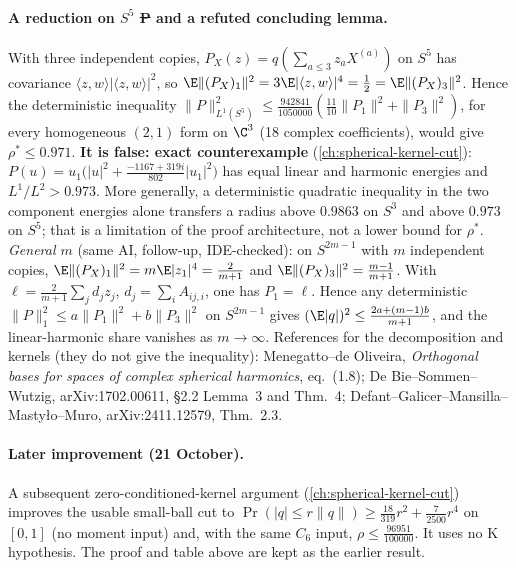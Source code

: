 \paragraph{A reduction on $S^5$ \st{P} and a refuted concluding lemma.} With three independent copies, $P_X(z)=q(\sum_{a\le3}z_aX^{(a)})$ on $S^5$ has covariance
$\langle z,w\rangle|\langle z,w\rangle|^2$, so $\E\|(P_X)_1\|^2=3\E|\langle z,w\rangle|^4=\frac12=\E\|(P_X)_3\|^2$. Hence the deterministic inequality
$\|P\|_{L^1(S^5)}^2\le\frac{942841}{1050000}(\frac{11}{10}\|P_1\|^2+\|P_3\|^2)$, for every homogeneous $(2,1)$ form on $\C^3$ (18 complex coefficients), would give
$\rho^*\le0.971$. \textbf{It is false: exact counterexample} (\autoref{ch:spherical-kernel-cut}): $P(u)=u_1\bigl(|u|^2+\frac{-1167+319i}{802}|u_1|^2\bigr)$ has
equal linear and harmonic energies and $L^1/L^2>0.973$. More generally, a deterministic quadratic inequality in the two component energies alone transfers
a radius above $0.9863$ on $S^3$ and above $0.973$ on $S^5$; that is a limitation of the proof architecture, not a lower bound for $\rho^*$. \emph{General $m$} (same AI, follow-up, IDE-checked):
on $S^{2m-1}$ with $m$ independent copies, $\E\|(P_X)_1\|^2=m\E|z_1|^4=\frac2{m+1}$ and $\E\|(P_X)_3\|^2=\frac{m-1}{m+1}$. With
$\ell=\frac2{m+1}\sum_jd_jz_j$, $d_j=\sum_iA_{ij,i}$, one has $P_1=\ell$. Hence any deterministic $\|P\|_1^2\le a\|P_1\|^2+b\|P_3\|^2$ on $S^{2m-1}$ gives
$(\E|q|)^2\le\frac{2a+(m-1)b}{m+1}$, and the linear-harmonic share vanishes as $m\to\infty$. References for the decomposition and kernels (they do not give the
inequality): Menegatto--de Oliveira, \emph{Orthogonal bases for spaces of complex spherical harmonics}, eq.~(1.8); De Bie--Sommen--Wutzig, arXiv:1702.00611,
§2.2 Lemma~3 and Thm.~4; Defant--Galicer--Mansilla--Masty{\l}o--Muro, arXiv:2411.12579, Thm.~2.3.

\paragraph{Later improvement (21 October).} A subsequent zero-conditioned-kernel argument (\autoref{ch:spherical-kernel-cut}) improves the usable small-ball cut
to $\Pr(|q|\le r\|q\|)\ge\frac{18}{319}r^2+\frac7{2500}r^4$ on $[0,1]$ (no moment input) and, with the same $C_6$ input, $\rho\le\frac{96951}{100000}$. It uses no K hypothesis. The
proof and table above are kept as the earlier result.


